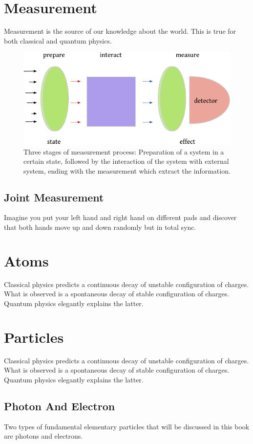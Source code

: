 \section{Measurement}
Measurement is the source of our knowledge about the world. This is true for both classical and quantum physics. 
\begin{figure}[htbp]
	\centering
	\includegraphics[scale=1.0]{measurementStages}
	\caption{Three stages of measurement process: Preparation of a system in a certain state, followed by the interaction of the system with external system, ending with the measurement which extract the information.}
	\label{fig:measurementStages}
\end{figure}

\subsection{Joint Measurement}
Imagine you put your left hand and right hand on different pads and discover that both hands move up and down randomly but in total sync.

\section{Atoms}
Classical physics predicts a continuous decay of unstable configuration of charges. What is observed is a spontaneous decay of stable configuration of charges. Quantum physics elegantly explains the latter.  

\section{Particles}
Classical physics predicts a continuous decay of unstable configuration of charges. What is observed is a spontaneous decay of stable configuration of charges. Quantum physics elegantly explains the latter.  
\subsection{Photon And Electron}
Two types of fundamental elementary particles that will be discussed in this book are photons and electrons.


